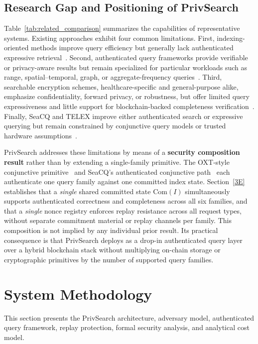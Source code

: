 \documentclass[journal]{IEEEtran}
\theoremstyle{tight}
\theoremstyle{remark}
\theoremstyle{plain}
\begin{document}
\subsection{Research Gap and Positioning of PrivSearch}
\label{2E}
Table~\ref{tab:related_comparison} summarizes the capabilities of representative systems. Existing approaches exhibit four common limitations. First, indexing-oriented methods improve query efficiency but generally lack authenticated expressive retrieval~\cite{Lai,Hu,Lee,WuHaotianPeng}. Second, authenticated query frameworks provide verifiable or privacy-aware results but remain specialized for particular workloads such as range, spatial--temporal, graph, or aggregate-frequency queries~\cite{Yin,Xu,Wu,Liu,Chen,Youlin}. Third, searchable encryption schemes, healthcare-specific and general-purpose alike, emphasize confidentiality, forward privacy, or robustness, but offer limited query expressiveness and little support for blockchain-backed completeness verification~\cite{LeeJoonYoung,Zhang,Yao,Lu,Li,Guo,Zheng}. Finally, SeaCQ and TELEX improve either authenticated search or expressive querying but remain constrained by conjunctive query models or trusted hardware assumptions~\cite{Yang,WuHaotian}.
 
PrivSearch addresses these limitations by means of a \textbf{security composition result} rather than by extending a single-family primitive. The OXT-style conjunctive primitive~\cite{Curtmola2006,Cash2013} and SeaCQ's authenticated conjunctive path~\cite{Yang} each authenticate one query family against one committed index state. Section~\ref{3E} establishes that a \emph{single} shared committed state $\mathrm{Com}(I)$ simultaneously supports authenticated correctness and completeness across all six families, and that a \emph{single} nonce registry enforces replay resistance across all request types, without separate commitment material or replay channels per family. This composition is not implied by any individual prior result. Its practical consequence is that PrivSearch deploys as a drop-in authenticated query layer over a hybrid blockchain stack without multiplying on-chain storage or cryptographic primitives by the number of supported query families.
 
\section{System Methodology}
\label{3}

This section presents the PrivSearch architecture, adversary model, authenticated query framework, replay protection, formal security analysis, and analytical cost model.
\end{document}
